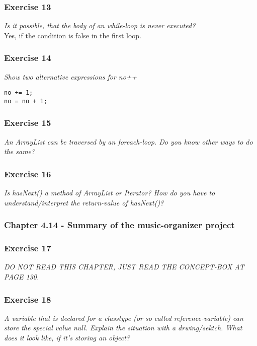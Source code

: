 \subsubsection*{Exercise 13}
\textit{Is it possible, that the body of an while-loop is never executed?}\\
Yes, if the condition is false in the first loop. 

\subsubsection*{Exercise 14}
\textit{Show two alternative expressions for no++}\\
\begin{lstlisting}
no += 1;
no = no + 1;
\end{lstlisting}

\subsubsection*{Exercise 15}
\textit{An ArrayList can be traversed by an foreach-loop. Do you know other
ways to do the same?}\\

\subsubsection*{Exercise 16}
\textit{Is hasNext() a method of ArrayList or Iterator? How do you have to 
understand/interpret the return-value of hasNext()?}\\

\subsubsection{Chapter 4.14 - Summary of the music-organizer project}

\subsubsection*{Exercise 17}
\textit{DO NOT READ THIS CHAPTER, JUST READ THE CONCEPT-BOX AT PAGE 130.}\\

\subsubsection*{Exercise 18}
\textit{A variable that is declared for a classtype (or so called 
reference-variable) can store the special value null. Explain the situation 
with a drwing/sektch. What does it look like, if it's storing an object?}\\

